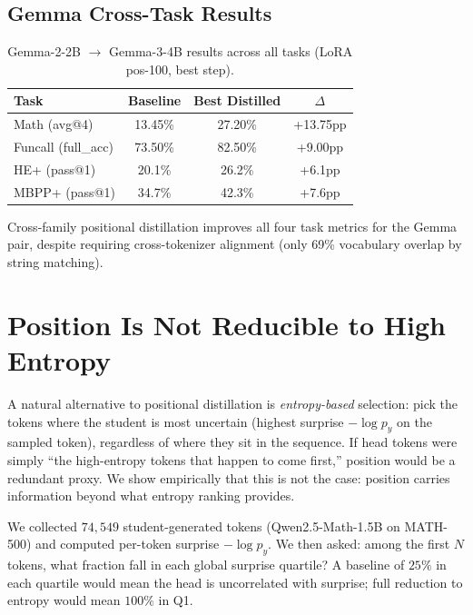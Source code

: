 \documentclass[10pt]{article}
\begin{document}
\subsection{Gemma Cross-Task Results}

\begin{table}[h]
\centering
\caption{Gemma-2-2B $\to$ Gemma-3-4B results across all tasks (LoRA pos-100, best step).}
\small
\begin{tabular}{@{}lccc@{}}
\toprule
\textbf{Task} & \textbf{Baseline} & \textbf{Best Distilled} & \textbf{$\Delta$} \\
\midrule
Math (avg@4) & 13.45\% & 27.20\% & +13.75pp \\
Funcall (full\_acc) & 73.50\% & 82.50\% & +9.00pp \\
HE+ (pass@1) & 20.1\% & 26.2\% & +6.1pp \\
MBPP+ (pass@1) & 34.7\% & 42.3\% & +7.6pp \\
\bottomrule
\end{tabular}
\end{table}

Cross-family positional distillation improves all four task metrics for the Gemma pair, despite requiring cross-tokenizer alignment (only 69\% vocabulary overlap by string matching).


\section{Position Is Not Reducible to High Entropy}
\label{app:position_vs_entropy}

A natural alternative to positional distillation is \emph{entropy-based} selection: pick the tokens where the student is most uncertain (highest surprise $-\log p_y$ on the sampled token), regardless of where they sit in the sequence. If head tokens were simply ``the high-entropy tokens that happen to come first,'' position would be a redundant proxy. We show empirically that this is not the case: position carries information beyond what entropy ranking provides.

We collected $74{,}549$ student-generated tokens (Qwen2.5-Math-1.5B on MATH-500) and computed per-token surprise $-\log p_y$. We then asked: among the first $N$ tokens, what fraction fall in each global surprise quartile? A baseline of $25\%$ in each quartile would mean the head is uncorrelated with surprise; full reduction to entropy would mean $100\%$ in Q1.
\end{document}
